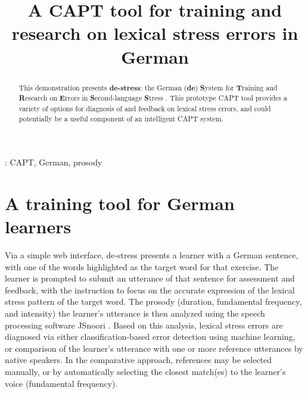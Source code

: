 \documentclass[a4paper]{article}
\title{A CAPT tool for training and research on lexical stress errors in German}
\begin{document}
  \maketitle
  \begin{abstract}
    This demonstration presents \textbf{de-stress}: the German (\textbf{de}) \textbf{S}ystem for \textbf{T}raining and \textbf{R}esearch on \textbf{E}rrors in \textbf{S}econd-language \textbf{S}tress \cite{destress}. 
    This prototype CAPT tool provides a variety of options for diagnosis of and feedback on lexical stress errors, and could potentially be a useful component of an intelligent CAPT system.
  \end{abstract}
  : CAPT, German, prosody


	
%

\section{A training tool for German learners}

 Via a simple web interface, de-stress presents a learner with a German sentence,
 with one of the words highlighted as the target word for that exercise. The learner is prompted to submit an utterance of that sentence for assessment and feedback, with the instruction to focus on the accurate expression of the lexical stress pattern of the target word. The prosody (duration, fundamental frequency, and intensity) the learner's utterance is then analyzed using the speech processing software JSnoori \cite{jsnoori}. Based on this analysis, lexical stress errors are diagnosed via either classification-based error detection using machine learning, or comparison of the learner's utterance with one or more reference utterances by native speakers. In the comparative approach, references may be selected manually, or by automatically selecting the closest match(es) to the learner's voice (fundamental frequency). 
 
\end{document}
